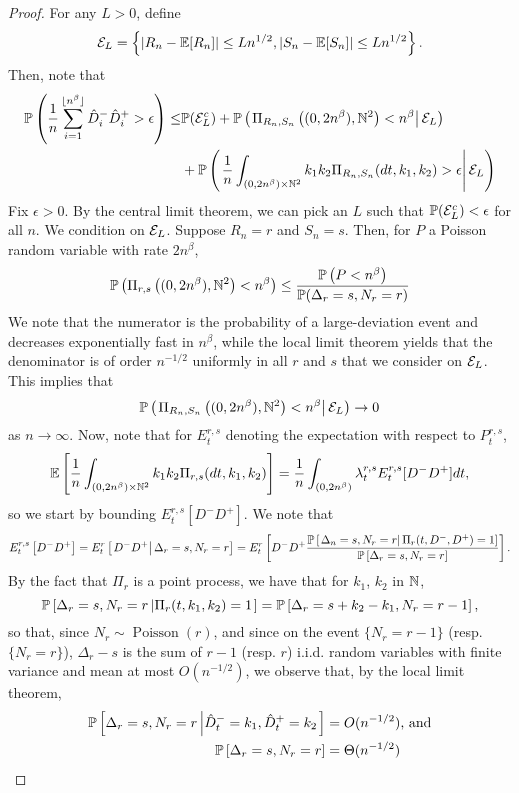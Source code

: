 \begin{proof}
For any $L>0$, define
$$\cE_L=\left\{|R_n-\E[R_n]|\leq Ln^{1/2},  |S_n-\E[S_n]|\leq Ln^{1/2}\right\}.$$
Then, note that 
\begin{align*}\P\left(\frac{1}{n}\sum_{i=1}^{\lfloor n^\beta\rfloor} \hat{D}_i^-\hat{D}_i^+>\epsilon \right)\leq & \P(\cE_L^c) + \P\left(\left.\Pi_{R_n,S_n}\left((0,2n^\beta),\N^2\right)<n^\beta\right|\cE_L \right)\\
&+\P\left(\left.\frac{1}{n}\int_{(0,2n^\beta)\times \N^2}k_1k_2 \Pi_{R_n,S_n}(dt,k_1,k_2)>\epsilon  \right|\cE_L \right)\end{align*}
Fix $\epsilon>0$. By the central limit theorem, we can pick an $L$ such that $\P(\cE_L^c)<\epsilon$ for all $n$. We condition on $\cE_L$. Suppose $R_n=r$ and $S_n=s$. Then, for $P$ a Poisson random variable with rate $2n^\beta$,
 $$\P\left(\Pi_{r,s}\left((0,2n^\beta),\N^2\right)<n^\beta\right)\leq \frac{\P\left(P<n^\beta\right)}{\P(\Delta_r=s, N_r=r)}$$
 We note that the numerator is the probability of a large-deviation event and decreases exponentially fast in $n^\beta$, while the local limit theorem yields that the denominator is of order $n^{-1/2}$ uniformly in all $r$ and $s$ that we consider on $\cE_L$. This implies that $$\P\left(\left.\Pi_{R_n,S_n}\left((0,2n^\beta),\N^2\right)<n^\beta\right|\cE_L\right)\to 0$$
as $n\to \infty$.  
Now, note that for $E^{r,s}_t$ denoting the expectation with respect to $P_t^{r,s}$,
$$\E\left[\frac{1}{n}\int_{(0,2n^\beta)\times \N^2}k_1k_2 \Pi_{r,s}(dt,k_1,k_2) \right]=\frac{1}{n}\int_{(0,2n^\beta)}\lambda^{r,s}_t E^{r,s}_t[D^- D^+]dt,$$
so we start by bounding $E^{r,s}_t[D^- D^+]$. 
We note that
$$E^{r,s}_t\left[{D}^-{D}^+\right]={E}^r_t\left[\left.{D}^-{D}^+\right| \Delta_r=s, N_r=r\right]={E}^r_t\left[{D}^-{D}^+\frac{\P\left[\left. \Delta_n=s, N_r=r \right|\Pi_r(t,D^-,D^+)=1\right]}{\P\left[ \Delta_r=s, N_r=r\right]}\right].$$
By the fact that $\Pi_r$ is a point process, we have that for $k_1$, $k_2$ in $\N$, 
$$\P\left[ \Delta_r=s, N_r=r \left| \Pi_r(t,k_1,k_2)=1\right.\right]=\P\left[ \Delta_r=s+k_2-k_1, N_r=r-1 \right],$$
so that, since $N_r\sim \operatorname{Poisson}(r)$, and since on the event $\{N_r=r-1\}$ (resp. $\{N_r=r\}$),  $\Delta_r-s$ is the sum of $r-1$ (resp. $r$) i.i.d. random variables with finite variance and mean at most $O(n^{-1/2})$, we observe that, by the local limit theorem,
\begin{align*}
    \P\left[ \Delta_r=s, N_r=r \left| \hat{D}^-_t=k_1,\hat{D}^+_t=k_2\right.\right]&=O(n^{-1/2})\text{, and}\\
    \P\left[ \Delta_r=s, N_r=r \right]&=\Theta(n^{-1/2})

\end{align*}
\end{proof}
